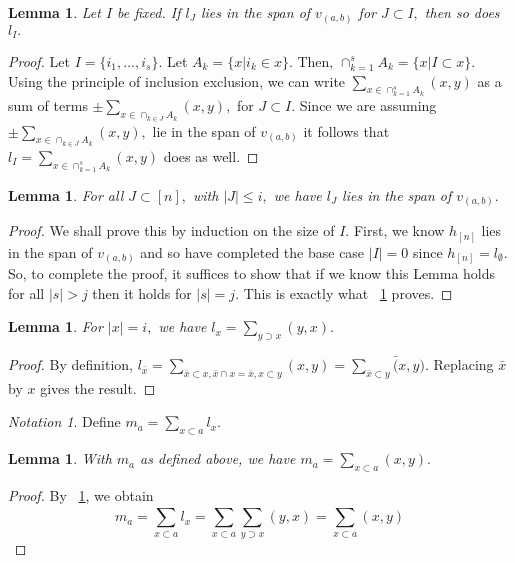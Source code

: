 \documentclass[10 pt]{amsart}
\theoremstyle{plain}
\newtheorem{lem}[thm]{Lemma}
\theoremstyle{definition}
\theoremstyle{remark}
\newtheorem{note}[thm]{Notation}
\numberwithin{equation}{section}
\begin{document}
\begin{lem}
\label{l_induction_step}
Let $I$ be fixed. If $l_J$ lies in the span of $v_{(a, b)}$ for $J \subset I,$ then so does $l_I.$

\end{lem}
\begin{proof}
Let $I = \{i_1,\ldots, i_s\}.$ Let $A_k = \{x | i_k \in x\}.$ Then, $\cap_{k=1}^s A_k = \{x | I \subset x\}.$ Using the principle of inclusion exclusion, we can write $\sum_{x \in\cap_{k=1}^s A_k} (x, y)$ as a sum of terms $\pm \sum_{x \in\cap_{k \in J} A_k} (x, y),$ for $J \subset I.$ Since we are assuming $\pm \sum_{x \in\cap_{k \in J} A_k} (x, y),$ lie in the span of $v_{(a, b)}$ it follows that $l_I = \sum_{x \in\cap_{k=1}^s A_k} (x, y)$ does as well.

\end{proof}

\begin{lem}
For all $J \subset [n],$ with $|J| \leq i,$ we have $l_{J}$ lies in the span of $v_{(a , b)}.$ 
\end{lem}
\begin{proof}
We shall prove this by induction on the size of $I.$ First, we know $h_{[n]}$ lies in the span of $v_{(a, b)}$ and so have completed the base case $|I| = 0$ since $h_{[n]} = l_{\emptyset}.$ So, to complete the proof, it suffices to show that if we know this Lemma holds for all $|s|>j$ then it holds for $|s| = j.$  This is exactly what ~\ref{l_induction_step} proves.
\end{proof}

\begin{lem}
\label{l_diag_equivalence}
For $|x| = i,$ we have $l_{x} = \sum_{y \supset x}^{}(y, x).$
\end{lem}
\begin{proof}
By definition, $l_{\bar x} = \sum_{\bar x\subset x,\bar x \cap x = \bar x,x\subset y}^{}(x, y) = \sum_{\bar x\subset y}^{}\bar (x, y).$ Replacing $\bar x$ by $x$ gives the result.
\end{proof}

\begin{note}
Define $m_a = \sum_{x \subset a}^{}l_{x}.$
\end{note}

\begin{lem}
\label{m_equivalence}
With $m_a$ as defined above, we have $m_a = \sum_{x\subset a}^{}(x, y).$
\end{lem}
\begin{proof}
By ~\ref{l_diag_equivalence}, we obtain
$$m_a = \sum_{x \subset a}^{}l_{x} = \sum_{x \subset a}^{}\sum_{y \supset x}^{}(y, x)= \sum_{x\subset a}^{}(x, y)$$
\end{proof}
\end{document}
